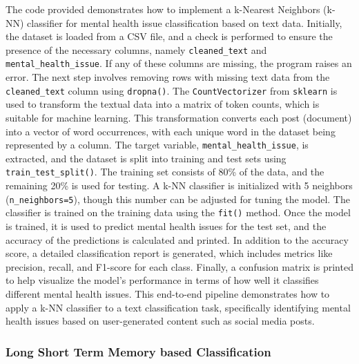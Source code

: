 \noindent
The code provided demonstrates how to implement a k-Nearest Neighbors (k-NN) classifier for mental health issue classification based on text data. Initially, the dataset is loaded from a CSV file, and a check is performed to ensure the presence of the necessary columns, namely \texttt{cleaned\_text} and \texttt{mental\_health\_issue}. If any of these columns are missing, the program raises an error. The next step involves removing rows with missing text data from the \texttt{cleaned\_text} column using \texttt{dropna()}. The \texttt{CountVectorizer} from \texttt{sklearn} is used to transform the textual data into a matrix of token counts, which is suitable for machine learning. This transformation converts each post (document) into a vector of word occurrences, with each unique word in the dataset being represented by a column. The target variable, \texttt{mental\_health\_issue}, is extracted, and the dataset is split into training and test sets using \texttt{train\_test\_split()}. The training set consists of 80\% of the data, and the remaining 20\% is used for testing. A k-NN classifier is initialized with 5 neighbors (\texttt{n\_neighbors=5}), though this number can be adjusted for tuning the model. The classifier is trained on the training data using the \texttt{fit()} method. Once the model is trained, it is used to predict mental health issues for the test set, and the accuracy of the predictions is calculated and printed. In addition to the accuracy score, a detailed classification report is generated, which includes metrics like precision, recall, and F1-score for each class. Finally, a confusion matrix is printed to help visualize the model’s performance in terms of how well it classifies different mental health issues. This end-to-end pipeline demonstrates how to apply a k-NN classifier to a text classification task, specifically identifying mental health issues based on user-generated content such as social media posts.




\subsubsection{Long Short Term Memory based Classification}

